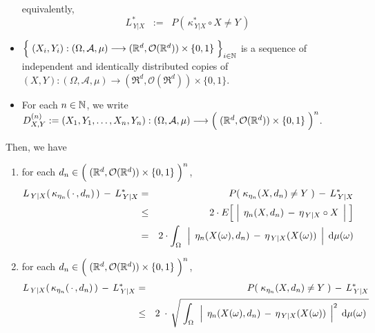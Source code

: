 \begin{theorem}
\begin{itemize}
	equivalently,
	\begin{equation*}
	L^{*}_{\,Y \vert X} \;\; := \;\; P\!\left(\, \kappa^{*}_{\,Y \vert X} \circ X \neq Y \,\right)
	\end{equation*}	
\item
	$\left\{\;
		(X_{i},Y_{i}) : (\Omega,\mathcal{A},\mu)
			\overset{{\color{white}-}}{\longrightarrow}
			(\Re^{d},\mathcal{O}(\Re^{d})) \times \{0,1\}
	\;\right\}_{i\in\N}$\;
	is a sequence of independent and identically distributed copies of
	$(X,Y) : (\Omega,\mathcal{A},\mu) \longrightarrow (\Re^{d},\mathcal{O}(\Re^{d})) \times \{0,1\}$.
\item
	For each $n \in \mathbb{N}$, we write
	$D^{(n)}_{X,Y} := (X_{1},Y_{1},\ldots,X_{n},Y_{n}) :
		(\Omega,\mathcal{A},\mu)
		\longrightarrow
		\left(\;(\Re^{d},\mathcal{O}(\Re^{d})) \overset{{\color{white}.}}{\times} \{0,1\} \;\right)^{n}$.
\end{itemize}
Then, we have
\begin{enumerate}
\item
	for each
	\;$d_{n} \in \left(\;(\Re^{d},\mathcal{O}(\Re^{d})) \overset{{\color{white}.}}{\times} \{0,1\} \;\right)^{n}$,
	\begin{eqnarray*}
	L_{\,Y \vert X}(\,\kappa_{\eta_{n}}(\,\cdot\,,d_{n})\,) \, - \, L^{*}_{\,Y \vert X}
	& = &
		P\!\left(\;\kappa_{\eta_{n}}(X,d_{n}) \neq Y \;\right) \,-\, L^{*}_{\,Y \vert X}
	\\
	& \leq &
		2 \cdot E\!\left[\;
			\left\vert\;\, \eta_{n}(X,d_{n}) \,\overset{{\color{white}.}}{-}\, \eta_{\,Y\vert X} \circ X \;\,\right\vert
			\;\right]
	\\
	& = &
		2 \cdot \int_{\Omega}\,\;
			\left\vert\;\, \eta_{n}(X(\omega),d_{n}) \,\overset{{\color{white}.}}{-}\, \eta_{\,Y\vert X}(X(\omega)) \;\,\right\vert
			\;\d\mu(\omega)
	\end{eqnarray*}
\item
	for each
	\;$d_{n} \in \left(\;(\Re^{d},\mathcal{O}(\Re^{d})) \overset{{\color{white}.}}{\times} \{0,1\} \;\right)^{n}$,
	\begin{eqnarray*}
	L_{\,Y \vert X}(\,\kappa_{\eta_{n}}(\,\cdot\,,d_{n})\,) \, - \, L^{*}_{\,Y \vert X}
	& = &
		P\!\left(\;\kappa_{\eta_{n}}(X,d_{n}) \neq Y \;\right) \,-\, L^{*}_{\,Y \vert X}
	\\
	& \leq &
		2 \;\cdot\,
		\sqrt{\;\int_{\Omega}\,\;
			\left\vert\;\, \eta_{n}(X(\omega),d_{n}) \,\overset{{\color{white}.}}{-}\, \eta_{\,Y\vert X}(X(\omega)) \;\,\right\vert^{2}
			\;\d\mu(\omega)
			\;}
	\end{eqnarray*}
\end{enumerate}
\end{theorem}
